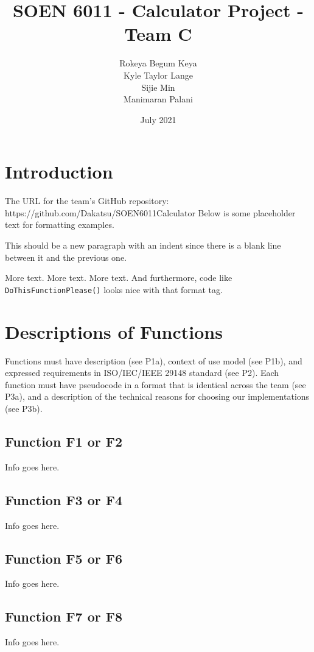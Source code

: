 \documentclass{report}
\title{SOEN 6011 - Calculator Project - Team C}
\author{
  Rokeya Begum Keya\\
  Kyle Taylor Lange\\
  Sijie Min\\
  Manimaran Palani\\
}
\date{July 2021}
\begin{document}
\maketitle

\section{Introduction}

\normalsize{The URL for the team's GitHub repository: https://github.com/Dakatsu/SOEN6011Calculator
Below is some placeholder text for formatting examples.

This should be a new paragraph with an indent since there is a blank line between it and the previous one. }\large{More text. }\Large{More text. }\LARGE{More text. } \normalsize{And furthermore, code like \texttt{DoThisFunctionPlease()} looks nice with that format tag.}

\section{Descriptions of Functions}
\normalsize{Functions must have description (see P1a), context of use model (see P1b), and expressed requirements in ISO/IEC/IEEE 29148 standard (see P2). Each function must have pseudocode in a format that is identical across the team (see P3a), and a description of the technical reasons for choosing our implementations (see P3b).}
\subsection{Function F1 or F2}
\normalsize{Info goes here.}

\subsection{Function F3 or F4}
\normalsize{Info goes here.}

\subsection{Function F5 or F6}
\normalsize{Info goes here.}

\subsection{Function F7 or F8}
\normalsize{Info goes here.}
\end{document}
